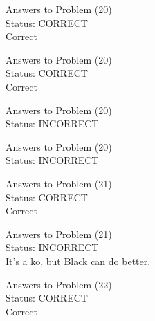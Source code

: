\documentclass[11pt]{article}
\begin{document}
\begin{minipage}[t]{0.5\textwidth}
  {\centering
  
  Answers to Problem (20)\\
  Status: CORRECT\\
  Correct\\
  }
\end{minipage}
\begin{minipage}[t]{0.5\textwidth}
  {\centering
  
  Answers to Problem (20)\\
  Status: CORRECT\\
  Correct\\
  }
\end{minipage}
\begin{minipage}[t]{0.5\textwidth}
  {\centering
  
  Answers to Problem (20)\\
  Status: INCORRECT\\
  
  }
\end{minipage}
\begin{minipage}[t]{0.5\textwidth}
  {\centering
  
  Answers to Problem (20)\\
  Status: INCORRECT\\
  
  }
\end{minipage}
\begin{minipage}[t]{0.5\textwidth}
  {\centering
  
  Answers to Problem (21)\\
  Status: CORRECT\\
  Correct\\
  }
\end{minipage}
\begin{minipage}[t]{0.5\textwidth}
  {\centering
  
  Answers to Problem (21)\\
  Status: INCORRECT\\
  It's a ko, but Black can do better.\\
  }
\end{minipage}
\begin{minipage}[t]{0.5\textwidth}
  {\centering
  
  Answers to Problem (22)\\
  Status: CORRECT\\
  Correct\\
  }
\end{minipage}
\end{document}

